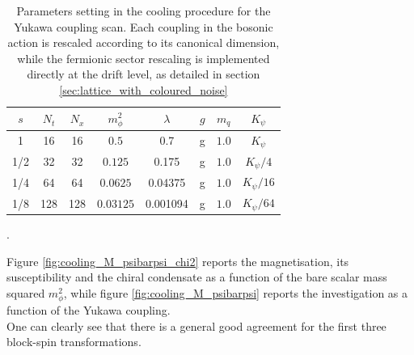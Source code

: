 \begin{table}[htp]
    \centering
    \begin{tabular}{cccccccc}
        \toprule
        $s$ & $N_t$ & $N_x$ & $m_\phi^2$ & $\lambda$ & $g$ & $m_q$& $K_\psi$ \\
        \midrule 
        1 & 16 & 16 & $0.5$ & 0.7 & g & $1.0$ & $K_\psi$ \\
        1/2 & 32 & 32 & $0.125$ & 0.175 & g & $1.0$ & $K_\psi/4$ \\
        1/4 & 64 & 64 & $0.0625$ & 0.04375 & g & $1.0$ & $K_\psi/16$ \\
        1/8 & 128 & 128 & $0.03125$ & 0.001094 & g & $1.0$ & $K_\psi/64$ \\
        \bottomrule
    \end{tabular}
    \caption[Parameter settings in the cooling procedure for the Yukawa coupling scan.]{Parameters setting in the cooling procedure for the Yukawa coupling scan. Each coupling in the bosonic action is rescaled according to its canonical dimension, while the fermionic sector rescaling is implemented directly at the drift level, as detailed in section \ref{sec:lattice_with_coloured_noise}}.
    \label{tab:params_cooling_yukawa}
\end{table}
Figure \ref{fig:cooling_M_psibarpsi_chi2} reports the magnetisation, its susceptibility and the chiral condensate as a function of the bare scalar mass squared $m_\phi^2$, while figure \ref{fig:cooling_M_psibarpsi} reports the investigation as a function of the Yukawa coupling. \\
One can clearly see that there is a general good agreement for the first three block-spin transformations.
